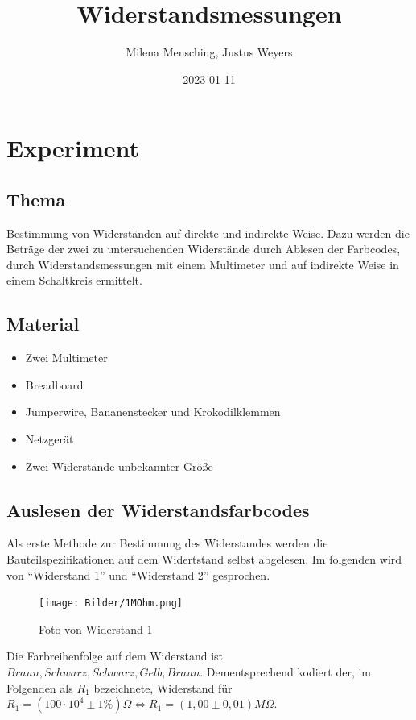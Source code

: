 \documentclass[class=article, crop=false]{standalone}
\title{Widerstandsmessungen}
\author{Milena Mensching, Justus Weyers}
\date{2023-01-11}
\begin{document}
\hypertarget{experiment}{%
\section{Experiment}\label{experiment}}

\hypertarget{thema}{%
\subsection{Thema}\label{thema}}

Bestimmung von Widerständen auf direkte und indirekte Weise. Dazu werden
die Beträge der zwei zu untersuchenden Widerstände durch Ablesen der
Farbcodes, durch Widerstandsmessungen mit einem Multimeter und auf
indirekte Weise in einem Schaltkreis ermittelt.

\hypertarget{material}{%
\subsection{Material}\label{material}}

\begin{itemize}
\item{Zwei Multimeter}
\item{Breadboard}
\item{Jumperwire, Bananenstecker und Krokodilklemmen}
\item{Netzgerät}
\item{Zwei Widerstände unbekannter Größe}
\end{itemize}

\hypertarget{auslesen-der-widerstandsfarbcodes}{%
\subsection{Auslesen der
Widerstandsfarbcodes}\label{auslesen-der-widerstandsfarbcodes}}

Als erste Methode zur Bestimmung des Widerstandes werden die
Bauteilspezifikationen auf dem Widertstand selbst abgelesen. Im
folgenden wird von ``Widerstand 1'' und ``Widerstand 2'' gesprochen.

\begin{figure}
\centering
\texttt{[image: Bilder/1MOhm.png]}
\caption{Foto von Widerstand 1}
\end{figure}

Die Farbreihenfolge auf dem Widerstand ist
\(Braun, Schwarz, Schwarz, Gelb, Braun\). Dementsprechend kodiert der,
im Folgenden als \(R_1\) bezeichnete, Widerstand für
\(R_1 = (100 \cdot 10^4\pm 1\% ) \Omega \Leftrightarrow R_1=(1,00\pm 0,01) M\Omega\).
\end{document}
